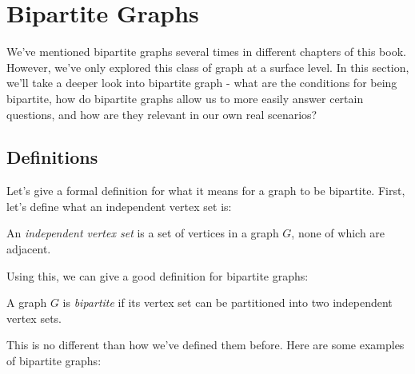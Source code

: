 \section{Bipartite Graphs}
We've mentioned bipartite graphs several times in different chapters of this book. However, we've only explored this class of graph at a surface level. In this section, we'll take a deeper look into bipartite graph - what are the conditions for being bipartite, how do bipartite graphs allow us to more easily answer certain questions, and how are they relevant in our own real scenarios?

\subsection{Definitions}
Let's give a formal definition for what it means for a graph to be bipartite. First, let's define what an independent vertex set is:

\begin{definition}
    An \textit{independent vertex set} is a set of vertices in a graph $G$, none of which are adjacent.
\end{definition}

Using this, we can give a good definition for bipartite graphs:

\begin{definition}
    A graph $G$ is \textit{bipartite} if its vertex set can be partitioned into two independent vertex sets.
\end{definition}

This is no different than how we've defined them before. Here are some examples of bipartite graphs:

